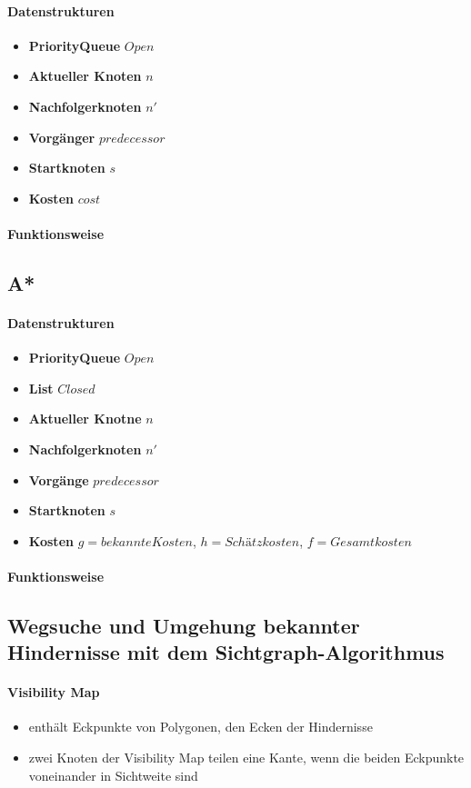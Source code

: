 \paragraph{Datenstrukturen}
\begin{itemize}
	\item \textbf{PriorityQueue} $Open$
	\item \textbf{Aktueller Knoten} $n$
	\item \textbf{Nachfolgerknoten} $n'$
	\item \textbf{Vorgänger} $predecessor$
	\item \textbf{Startknoten} $s$
	\item \textbf{Kosten} $cost$
\end{itemize}
\paragraph{Funktionsweise}
\subsection{A*}
\paragraph{Datenstrukturen}
\begin{itemize}
	\item \textbf{PriorityQueue} $Open$
	\item \textbf{List} $Closed$
	\item \textbf{Aktueller Knotne} $n$
	\item \textbf{Nachfolgerknoten} $n'$
	\item \textbf{Vorgänge} $predecessor$
	\item \textbf{Startknoten} $s$
	\item \textbf{Kosten} $g = bekannte Kosten$, $h = Schätzkosten$, $f = Gesamtkosten$
\end{itemize}
\paragraph{Funktionsweise}
\subsection{Wegsuche und Umgehung bekannter Hindernisse mit dem Sichtgraph-Algorithmus}
\paragraph{Visibility Map}
\begin{itemize}
	\item enthält Eckpunkte von Polygonen, den Ecken der Hindernisse
	\item zwei Knoten der Visibility Map teilen eine Kante, wenn die beiden Eckpunkte voneinander in Sichtweite sind
\end{itemize}

